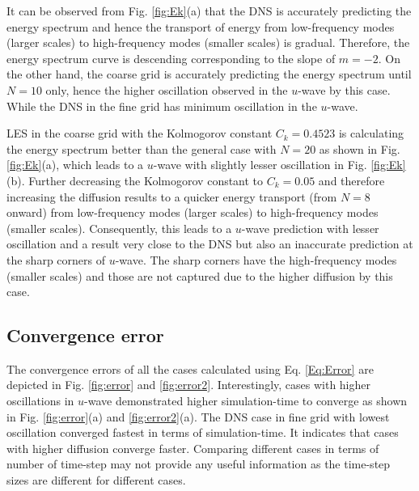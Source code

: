 \documentclass[a4paper]{article}
\begin{document}

It can be observed from Fig. \ref{fig:Ek}(a) that the DNS is accurately predicting the energy spectrum and hence the transport of energy from low-frequency modes (larger scales) to high-frequency modes (smaller scales) is gradual. Therefore, the energy spectrum curve is descending corresponding to the slope of $ m=-2 $. On the other hand, the coarse grid is accurately predicting the energy spectrum until $ N=10 $ only, hence the higher oscillation observed in the $ u $-wave by this case. While the DNS in the fine grid has minimum oscillation in the $ u $-wave.

LES in the coarse grid with the Kolmogorov constant $ C_k = 0.4523 $ is calculating the energy spectrum better than the general case with $ N=20 $  as shown in Fig. \ref{fig:Ek}(a), which leads to a $ u $-wave with slightly lesser oscillation in Fig. \ref{fig:Ek}(b). Further decreasing the Kolmogorov constant to $ C_k = 0.05 $ and therefore increasing the diffusion results to a quicker energy transport (from $ N=8 $ onward) from low-frequency modes (larger scales) to high-frequency modes (smaller scales). Consequently, this leads to a $ u $-wave prediction with lesser oscillation and a result very close to the DNS but also an inaccurate prediction at the sharp corners of $ u $-wave. The sharp corners have the high-frequency modes (smaller scales) and those are not captured due to the higher diffusion by this case.

\subsection{Convergence error}
The convergence errors of all the cases calculated using Eq. \ref{Eq:Error} are depicted in Fig. \ref{fig:error} and \ref{fig:error2}. Interestingly, cases with higher oscillations in $ u $-wave demonstrated higher simulation-time to converge as shown in Fig. \ref{fig:error}(a) and \ref{fig:error2}(a). The DNS case in fine grid with lowest oscillation converged fastest in terms of simulation-time. It indicates that cases with higher diffusion converge faster. Comparing different cases in terms of number of time-step may not provide any useful information as the time-step sizes are different for different cases.
\end{document}
